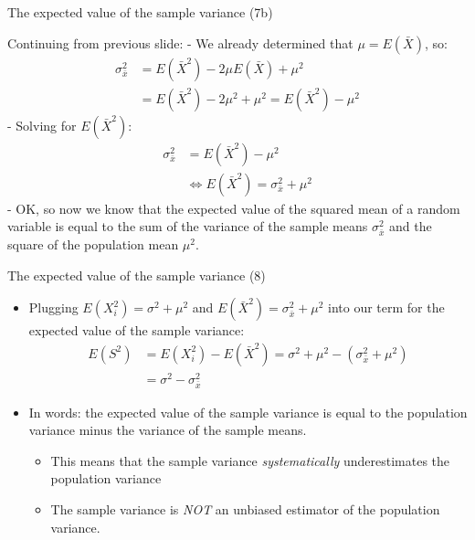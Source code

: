 \begin{frame}{The expected value of the sample variance (7b)}

Continuing from previous slide: - We already determined that
\(\mu = E(\bar{X})\), so: \[
\begin{aligned}
\sigma_{\bar{x}}^2 &= E(\bar{X}^2) - 2\mu E(\bar{X}) + \mu^2 \\
         &= E(\bar{X}^2) - 2\mu^2 + \mu^2 = E(\bar{X}^2) - \mu^2 
\end{aligned}
\] - Solving for \(E(\bar{X}^2)\): \[\begin{aligned}
\sigma_{\bar{x}}^2 &= E(\bar{X}^2) - \mu^2  \\
&\Leftrightarrow E(\bar{X}^2) = \sigma_{\bar{x}}^2 + \mu^2
\end{aligned}
\] - OK, so now we know that the expected value of the squared mean of a
random variable is equal to the sum of the variance of the sample means
\(\sigma_{\bar{x}}^2\) and the square of the population mean \(\mu^2\).

\end{frame}

\begin{frame}{The expected value of the sample variance (8)}

\begin{itemize}
\itemsep1pt\parskip0pt
\item
  Plugging \(E(X_i^2) = \sigma^2 + \mu^2\) and
  \(E(\bar{X}^2) = \sigma_{\bar{x}}^2 + \mu^2\) into our term for the
  expected value of the sample variance: \[
  \begin{aligned}
  E(S^2) &= E(X_i^2)-E(\bar{X}^2) = \sigma^2 + \mu^2 - (\sigma_{\bar{x}}^2 + \mu^2) \\
     &= \sigma^2 - \sigma_{\bar{x}}^2
  \end{aligned}
  \]
\item
  In words: the expected value of the sample variance is equal to the
  population variance minus the variance of the sample means.

  \begin{itemize}
  \itemsep1pt\parskip0pt
  \item
    This means that the sample variance \emph{systematically}
    underestimates the population variance
  \item
    The sample variance is \emph{NOT} an unbiased estimator of the
    population variance.
  \end{itemize}
\end{itemize}

\end{frame}

